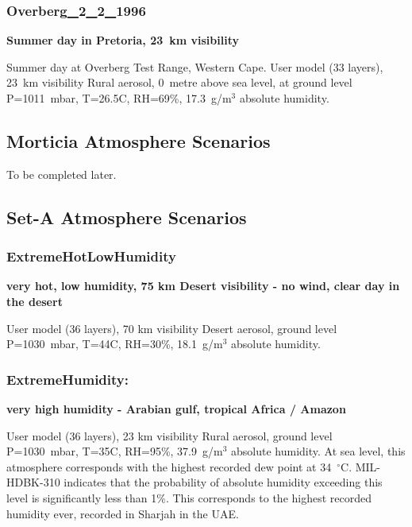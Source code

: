 \documentclass{workpackage}
\newcommand\purl[1]{\protect\url{#1}} %
\begin{document}
\subsubsection{Overberg\purl{_}2\purl{_}2\purl{_}1996}
\label{sec:Overberg221996}

\textbf{Summer day in Pretoria, 23~\si{\kilo\metre} visibility}

Summer day at Overberg Test Range, Western Cape.
User model (33 layers), 23~\si{\kilo\metre} visibility Rural aerosol,  0~\si{metre} above sea level,   at ground level P=1011~mbar, T=26.5C, RH=69\%, 17.3~g/m$^3$  absolute humidity.



\subsection{Morticia Atmosphere Scenarios}
\label{sec:MorticiaAtmosphereScenarios}

To be completed later.

\subsection{Set-A Atmosphere Scenarios}
\label{sec:SetAAtmosphereScenarios}


\subsubsection{ExtremeHotLowHumidity}
\label{sec:ExtremeHotLowHumidity}

\textbf{very hot, low humidity, 75 km Desert visibility - no wind, clear day in the desert}

User model (36 layers), 70 km visibility  Desert aerosol, ground level P=1030~mbar, T=44C, RH=30\%, 18.1~g/m$^3$  absolute humidity.

\subsubsection{ExtremeHumidity:}
\label{sec:ExtremeHumidity}

\textbf{very high humidity - Arabian gulf, tropical Africa / Amazon}

User model (36 layers), 23 km visibility  Rural aerosol, ground level P=1030~mbar, T=35C, RH=95\%, 37.9~g/m$^3$ absolute humidity. 
At sea level, this atmosphere corresponds with  the highest recorded dew point at 34~$^\circ$C.  MIL-HDBK-310 indicates that the probability of absolute humidity exceeding this level is significantly less than 1\%. This corresponds to the highest recorded humidity ever, recorded in Sharjah in the UAE.
\end{document}
